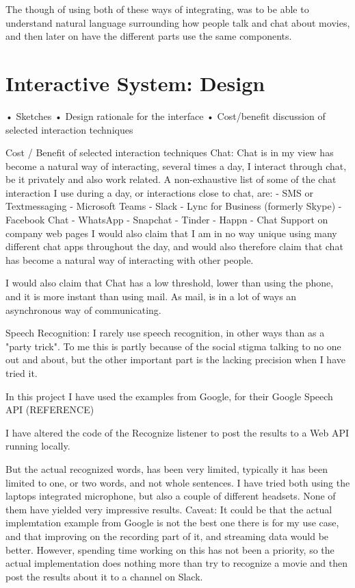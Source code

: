 \documentclass[11pt,fleqn]{book} %
\begin{document}
The though of using both of these ways of integrating, was to be able to understand natural language surrounding how people talk and chat about movies, and then later on have the different parts use the same components.




\chapter{Interactive System: Design}
•	Sketches
•	Design rationale for the interface
•	Cost/benefit discussion of selected interaction techniques

Cost / Benefit of selected interaction techniques
Chat:
Chat is in my view has become a natural way of interacting, several times a day, I interact through chat, be it privately and also work related. A non-exhaustive list of some of the chat interaction I use during a day, or interactions close to chat, are:
- SMS or Textmessaging
- Microsoft Teams
- Slack
- Lync for Business (formerly Skype)
- Facebook Chat
- WhatsApp
- Snapchat 
- Tinder
- Happn
- Chat Support on company web pages
I would also claim that I am in no way unique using many different chat apps throughout the day, and would also therefore claim that chat has become a natural way of interacting with other people.

I would also claim that Chat has a low threshold, lower than using the phone, and it is more instant than using mail. As mail, is in a lot of ways an asynchronous way of communicating.

Speech Recognition:
I rarely use speech recognition, in other ways than as a "party trick". To me this is partly because of the social stigma talking to no one out and about, but the other important part is the lacking precision when I have tried it.

In this project I have used the examples from Google, for their Google Speech API
(REFERENCE)

I have altered the code of the Recognize listener to post the results to a Web API running locally.

But the actual recognized words, has been very limited, typically it has been limited to one, or two words, and not whole sentences.
I have tried both using the laptops integrated microphone, but also a couple of different headsets. None of them have yielded very impressive results.
Caveat: It could be that the actual implemtation example from Google is not the best one there is for my use case, and that improving on the recording part of it, and streaming data would be better. However, spending time working on this has not been a priority, so the actual implementation does nothing more than try to recognize a movie and then post the results about it to a channel on Slack.
\end{document}
